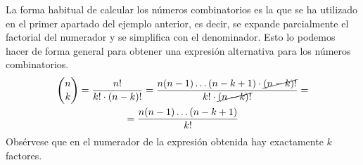 La forma habitual de calcular los números combinatorios es la que se ha utilizado en el primer apartado del ejemplo anterior, es decir, se expande parcialmente el factorial del numerador y se simplifica con el denominador.
Esto lo podemos hacer de forma general para obtener una expresión alternativa para los números combinatorios.
%
\begin{multline*}%
\binom{n}{k} = \frac{n!}{k!\cdot(n-k)!}
= \frac{n(n-1)\ldots(n-k+1)\cdot\cancel{(n-k)!}}{k!\cdot\cancel{(n-k)!}}=\\
=\frac{n(n-1)\ldots(n-k+1)}{k!}
\end{multline*}
%
Obsérvese que en el numerador de la expresión obtenida hay exactamente $k$ factores.
%

